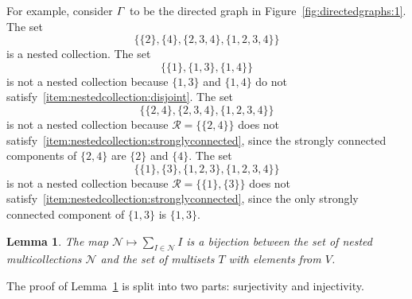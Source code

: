 \documentclass[11pt]{article}
\newtheorem{lemm}[theo]{Lemma}
\theoremstyle{definition}
\numberwithin{equation}{section}
\newcommand{\vertices}{V}
\begin{document}
For example,
consider \(\varGamma\) to be the directed graph in Figure~\ref{fig:directedgraphs:1}.
The set
\begin{equation*}
    \{
        \{2\},
        \{4\},
        \{2, 3, 4\},
        \{1, 2, 3, 4\}
    \}
\end{equation*} 
is a nested collection.
The set
\begin{equation*}
    \{
        \{1\},
        \{1, 3\},
        \{1, 4\}
    \}
\end{equation*}
is not a nested collection because \(\{1, 3\}\) and \(\{1, 4\}\) do not satisfy~\ref{item:nestedcollection:disjoint}.
The set
\begin{equation*}
    \{
        \{2, 4\},
        \{2, 3, 4\},
        \{1, 2, 3, 4\}
    \}
\end{equation*}
is not a nested collection because \(\mathcal{R} = \{ \{2, 4\} \}\) does not satisfy~\ref{item:nestedcollection:stronglyconnected}, since the strongly connected components of \(\{2, 4\}\) are \(\{2\}\) and \(\{4\}\).
The set
\begin{equation*}
    \{
        \{1\},
        \{3\},
        \{1, 2, 3\},
        \{1, 2, 3, 4\}
    \}
\end{equation*}
is not a nested collection because \(\mathcal{R} = \{ \{1\}, \{3\} \}\) does not satisfy~\ref{item:nestedcollection:stronglyconnected}, since the only strongly connected component of \(\{1, 3\}\) is \(\{1, 3\}\).

\begin{lemm} \label{lemma:multinested:unique}
    The map \(\mathcal{N} \mapsto \sum_{I \in \mathcal{N}} I\) is a bijection between the set of nested multicollections \(\mathcal{N}\) and the set of multisets \(T\) with elements from \(\vertices\).
\end{lemm}

The proof of Lemma~\ref{lemma:multinested:unique} is split into two parts: surjectivity and injectivity.
\end{document}
